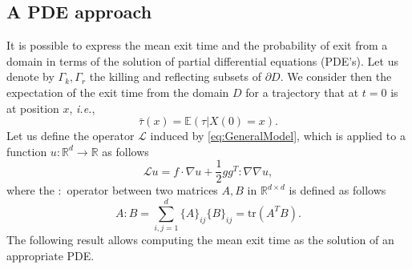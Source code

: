 \subsection{A PDE approach}\label{sec:PDEs}
It is possible to express the mean exit time and the probability of exit from a domain in terms of the solution of partial differential equations (PDE's).
Let us denote by $\Gamma_k,\Gamma_r$ the killing and reflecting subsets of $\partial D$. We consider then the expectation of the exit time from the domain $D$ for a trajectory that at $t=0$ is at position $x$, \textit{i.e.},
\begin{equation}\label{eq:ExpTau}
	\bar\tau(x) = \mathbb{E}(\tau | X(0) = x).
\end{equation}
Let us define the operator $\mathcal L$ induced by \eqref{eq:GeneralModel}, which is applied to a function $u\colon \mathbb{R}^d \rightarrow \mathbb{R}$  as follows
\begin{equation}\label{eq:LOperator}
	\mathcal Lu = f \cdot \nabla u + \frac{1}{2} gg^T : \nabla \nabla u,
\end{equation}
where the $:$ operator between two matrices $A,B$ in $\mathbb{R}^{d\times d}$ is defined as follows
\begin{equation}\label{eq:twoPoints}
	A : B = \sum_{i,j = 1}^d \{A\}_{ij}\{B\}_{ij} = \text{tr}(A^TB).
\end{equation}
The following result allows computing the mean exit time as the solution of an appropriate PDE.

